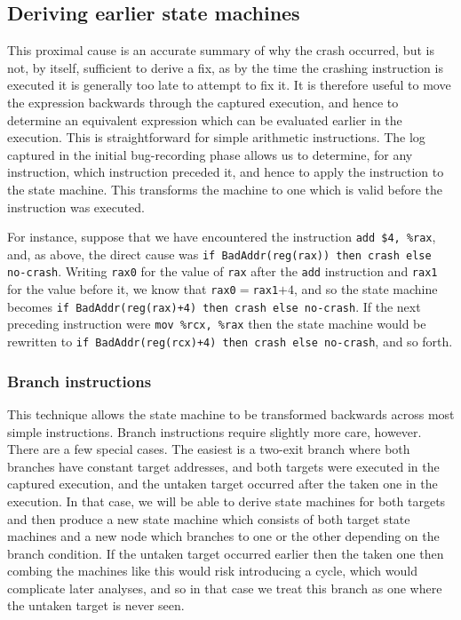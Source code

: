 \documentclass[10pt,twocolumn,preprint,natbib,authoryear]{sigplanconf}
\begin{document}
\subsection{Deriving earlier state machines}
This proximal cause is an accurate summary of why the crash occurred,
but is not, by itself, sufficient to derive a fix, as by the time the
crashing instruction is executed it is generally too late to attempt
to fix it.  It is therefore useful to move the expression backwards
through the captured execution, and hence to determine an equivalent
expression which can be evaluated earlier in the execution.  This is
straightforward for simple arithmetic instructions.  The log captured
in the initial bug-recording phase allows us to determine, for any
instruction, which instruction preceded it, and hence to apply the
instruction to the state machine.  This transforms the machine to one
which is valid before the instruction was executed.

For instance, suppose that we have encountered the instruction
\verb|add $4, %rax|, and, as above, the direct cause was
\verb|if BadAddr(reg(rax)) then crash else no-crash|.  Writing
\verb|rax0| for the value of \verb|rax| after the \verb|add|
instruction and \verb|rax1| for the value before it, we know that
\verb|rax0|$=$\verb|rax1|$+4$, and so the state machine becomes
\verb|if BadAddr(reg(rax)+4) then crash else no-crash|.  If the next
preceding instruction were \verb|mov %rcx, %rax| then the state
machine would be rewritten to
\verb|if BadAddr(reg(rcx)+4) then crash else no-crash|, and so forth.

\subsubsection{Branch instructions}
This technique allows the state machine to be transformed backwards
across most simple instructions.  Branch instructions require slightly
more care, however.  There are a few special cases.  The easiest is a
two-exit branch where both branches have constant target addresses,
and both targets were executed in the captured execution, and the
untaken target occurred after the taken one in the execution.  In that
case, we will be able to derive state machines for both targets and
then produce a new state machine which consists of both target state
machines and a new node which branches to one or the other depending
on the branch condition.  If the untaken target occurred earlier then
the taken one then combing the machines like this would risk
introducing a cycle, which would complicate later analyses, and so in
that case we treat this branch as one where the untaken target is
never seen.
\end{document}
